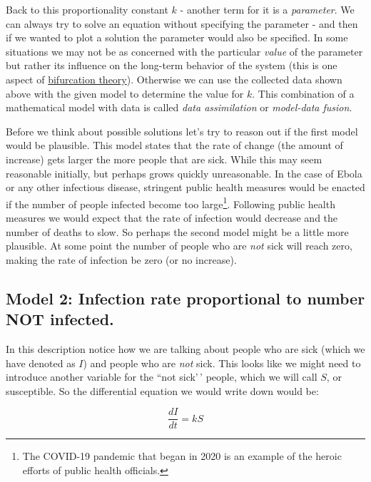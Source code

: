 \documentclass[
]{book}
\theoremstyle{definition}
\theoremstyle{definition}
\theoremstyle{definition}
\theoremstyle{remark}
\begin{document}
Back to this proportionality constant \(k\) - another term for it is a \emph{parameter}. We can always try to solve an equation without specifying the parameter - and then if we wanted to plot a solution the parameter would also be specified. In some situations we may not be as concerned with the particular \emph{value} of the parameter but rather its influence on the long-term behavior of the system (this is one aspect of \href{https://en.wikipedia.org/wiki/Bifurcation_theory}{bifurcation theory}). Otherwise we can use the collected data shown above with the given model to determine the value for \(k\). This combination of a mathematical model with data is called \emph{data assimilation} or \emph{model-data fusion}.

Before we think about possible solutions let's try to reason out if the first model would be plausible. This model states that the rate of change (the amount of increase) gets larger the more people that are sick. While this may seem reasonable initially, but perhaps grows quickly unreasonable. In the case of Ebola or any other infectious disease, stringent public health measures would be enacted if the number of people infected become too large\footnote{The COVID-19 pandemic that began in 2020 is an example of the heroic efforts of public health officials.}. Following public health measures we would expect that the rate of infection would decrease and the number of deaths to slow. So perhaps the second model might be a little more plausible. At some point the number of people who are \emph{not} sick will reach zero, making the rate of infection be zero (or no increase).

\hypertarget{model-2-infection-rate-proportional-to-number-not-infected.}{%
\subsection{Model 2: Infection rate proportional to number NOT infected.}\label{model-2-infection-rate-proportional-to-number-not-infected.}}

In this description notice how we are talking about people who are sick (which we have denoted as \(I\)) and people who are \emph{not} sick. This looks like we might need to introduce another variable for the ``not sick'\,' people, which we will call \(S\), or susceptible. So the differential equation we would write down would be:

\begin{equation} 
\frac{dI}{dt} = kS  \label{eq:01notinfected}
\end{equation}
\end{document}
